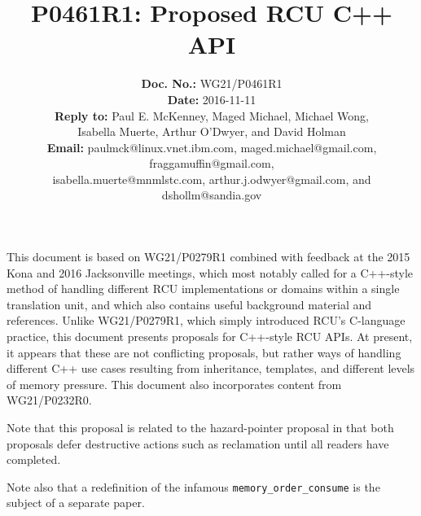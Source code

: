 \documentclass[letterpaper,twocolumn,10pt]{article}
\begin{document}
\newcommand{\co}[1]{\lstinline[breaklines=yes,breakatwhitespace=yes]{#1}}

\title{P0461R1: Proposed RCU C++ API}

\author{
{\bf Doc. No.: } WG21/P0461R1 \\
{\bf Date: } 2016-11-11 \\
{\bf Reply to: } Paul E. McKenney, Maged Michael, Michael Wong,\\
Isabella Muerte, Arthur O'Dwyer, and David Holman \\
{\bf Email: } paulmck@linux.vnet.ibm.com, maged.michael@gmail.com,
fraggamuffin@gmail.com,\\
isabella.muerte@mnmlstc.com, arthur.j.odwyer@gmail.com, and
dshollm@sandia.gov
} %


\pagestyle{myheadings}

\maketitle


This document is based on WG21/P0279R1 combined with feedback at
the 2015 Kona and 2016 Jacksonville meetings, which most notably called
for a C++-style method of handling different RCU implementations or
domains within a single translation unit, and which also contains
useful background material and references.
Unlike WG21/P0279R1, which simply introduced RCU's C-language practice,
this document presents proposals for C++-style RCU APIs.
At present, it appears that these are not conflicting proposals, but
rather ways of handling different C++ use cases resulting from
inheritance, templates, and different levels of memory pressure.
This document also incorporates content from
WG21/P0232R0\cite{PaulEMcKennneyToolKitP0232R0}.

Note that this proposal is related to the hazard-pointer proposal in
that both proposals defer destructive actions such as reclamation until
all readers have completed.

Note also that a redefinition of the infamous \co{memory_order_consume}
is the subject of a separate paper.
\end{document}
